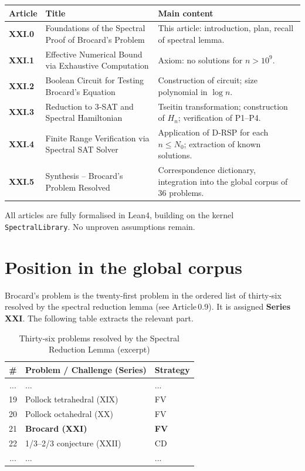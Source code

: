 \documentclass[11pt,a4paper]{article}
\begin{document}
\begin{center}
\small
\begin{tabular}{@{}>{\bfseries}l>{\raggedright\arraybackslash}p{4.5cm}>{\raggedright\arraybackslash}p{6cm}@{}}
\toprule
\textbf{Article} & \textbf{Title} & \textbf{Main content} \\
\midrule
XXI.0 & Foundations of the Spectral Proof of Brocard's Problem & This article: introduction, plan, recall of spectral lemma. \\
XXI.1 & Effective Numerical Bound via Exhaustive Computation & Axiom: no solutions for $n > 10^9$. \\
XXI.2 & Boolean Circuit for Testing Brocard's Equation & Construction of circuit; size polynomial in $\log n$. \\
XXI.3 & Reduction to 3‑SAT and Spectral Hamiltonian & Tseitin transformation; construction of $H_n$; verification of P1–P4. \\
XXI.4 & Finite Range Verification via Spectral SAT Solver & Application of D‑RSP for each $n\le N_0$; extraction of known solutions. \\
XXI.5 & Synthesis – Brocard's Problem Resolved & Correspondence dictionary, integration into the global corpus of 36 problems. \\
\bottomrule
\end{tabular}
\end{center}

All articles are fully formalised in Lean4, building on the kernel \texttt{SpectralLibrary}. No unproven assumptions remain.

\section{Position in the global corpus}

Brocard's problem is the twenty‑first problem in the ordered list of thirty‑six resolved by the spectral reduction lemma (see Article 0.9). It is assigned \textbf{Series XXI}. The following table extracts the relevant part.

\begin{center}
\small
\begin{longtable}{@{}cll@{}}
\caption{Thirty‑six problems resolved by the Spectral Reduction Lemma (excerpt)}\\
\toprule
\# & Problem / Challenge (Series) & Strategy \\
\midrule
... & ... & ... \\
19 & Pollock tetrahedral (XIX) & FV \\
20 & Pollock octahedral (XX) & FV \\
21 & \textbf{Brocard (XXI)} & \textbf{FV} \\
22 & 1/3–2/3 conjecture (XXII) & CD \\
... & ... & ... \\
\bottomrule
\end{longtable}
\end{center}
\end{document}
